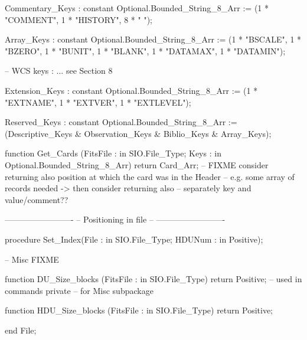    Commentary_Keys : constant Optional.Bounded_String_8_Arr := 
		(1 * "COMMENT", 1 * "HISTORY", 8 * " ");

   Array_Keys : constant Optional.Bounded_String_8_Arr := 
		(1 * "BSCALE", 1 * "BZERO", 1 * "BUNIT", 1 * "BLANK",
		 1 * "DATAMAX", 1 * "DATAMIN");

-- WCS keys : ... see Section 8

   Extension_Keys : constant Optional.Bounded_String_8_Arr :=
	(1 * "EXTNAME", 1 * "EXTVER", 1 * "EXTLEVEL");

   Reserved_Keys : constant Optional.Bounded_String_8_Arr :=
	(Descriptive_Keys & Observation_Keys & Biblio_Keys & Array_Keys);

   function  Get_Cards (FitsFile : in  SIO.File_Type;
			Keys : in Optional.Bounded_String_8_Arr)
      return Card_Arr;
-- FIXME consider returning also position at which the card was in the Header
-- e.g. some array of records needed -> then consider returning also 
-- separately key and value/comment??

   -------------------------
   -- Positioning in file --
   -------------------------

   procedure Set_Index(File : in SIO.File_Type;
                       HDUNum   : in Positive);





   -- Misc FIXME

	function  DU_Size_blocks (FitsFile : in SIO.File_Type) return Positive;	
	-- used in commands
private
	-- for Misc subpackage
	
	function  HDU_Size_blocks (FitsFile : in SIO.File_Type) return Positive;	

end File;
